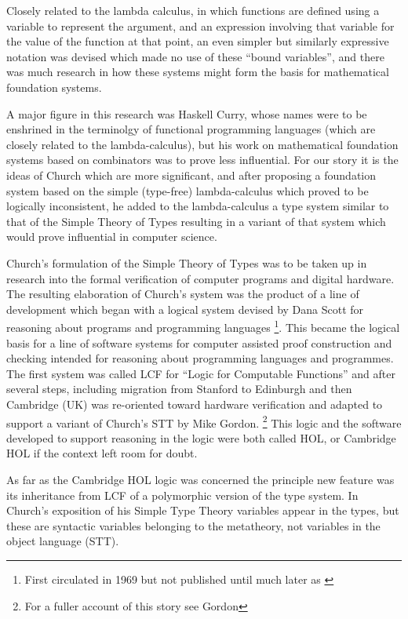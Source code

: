 \documentclass[10pt,titlepage]{book}
\begin{document}
Closely related to the lambda calculus, in which functions are defined using a variable to represent the argument, and an expression involving that variable for the value of the function at that point, an even simpler but similarly expressive notation was devised which made no use of these ``bound variables'', and there was much research in how these systems might form the basis for mathematical foundation systems.

A major figure in this research was Haskell Curry, whose names were to be enshrined in the terminolgy of functional programming languages (which are closely related to the lambda-calculus), but his work on mathematical foundation systems based on combinators was to prove less influential.
For our story it is the ideas of Church which are more significant, and after proposing a foundation system based on the simple (type-free) lambda-calculus which proved to be logically inconsistent, he added to the lambda-calculus a type system similar to that of the Simple Theory of Types resulting in a variant of that system which would prove influential in computer science.

Church's formulation of the Simple Theory of Types \cite{churchSTT} was to be taken up in research into the formal verification of computer programs and digital hardware.
The resulting elaboration of Church's system was the product of a line of development which began with a logical system devised by Dana Scott for reasoning about programs and programming languages
\footnote{First circulated in 1969 but not published until much later as \cite{scott1993type}}.
This became the logical basis for a line of software systems for computer assisted proof construction and checking intended for reasoning about programming languages and programmes.
The first system was called LCF for ``Logic for Computable Functions'' and after several steps, including migration from Stanford to Edinburgh and then Cambridge (UK) was re-oriented toward hardware verification and adapted to support a variant of Church's STT by Mike Gordon.%
\footnote{For a fuller account of this story see Gordon\cite{gordon2000lcf,plotkin2000proof}}
This logic and the software developed to support reasoning in the logic were both called HOL, or Cambridge HOL if the context left room for doubt.

As far as the Cambridge HOL logic was concerned the principle new feature was its inheritance from LCF of a polymorphic version of the type system.
In Church's exposition of his Simple Type Theory variables appear in the types, but these are syntactic variables belonging to the metatheory, not variables in the object language (STT).
\end{document}

